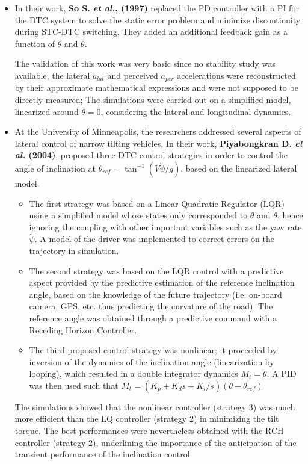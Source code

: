 \begin{itemize}
\begin{itemize}
\item In their work, \textbf{So S. \textit{et al.}, (1997)}\cite{doi:10.1504/IJVD.1997.062071} replaced the PD controller with a PI for the DTC system to solve the static error problem and minimize discontinuity during STC-DTC switching. They added an additional feedback gain as a function of $\theta$ and $\dot{\theta}$. 

The validation of this work was very basic since no stability study was available, the lateral $a_{lat}$ and perceived $a_{per}$ accelerations were reconstructed by their approximate mathematical expressions and were not supposed to be directly measured; The simulations were carried out on a simplified model, linearized around $\theta=0$, considering the lateral and longitudinal dynamics.
\newpage
\item At the University of Minneapolis, the researchers addressed several aspects of lateral control of narrow tilting vehicles. In their work, \textbf{Piyabongkran D. \textit{et al.} (2004)}\cite{piyabongkarn2004active}, proposed three DTC control strategies in order to control the angle of inclination at $\theta_{ref}=\tan^{-1}(V\dot{\psi}/g)$, based on the linearized lateral model. 

\begin{itemize}
\item The first strategy was based on a Linear Quadratic Regulator (LQR) using a simplified model whose states only corresponded to $\theta$ and $\dot{\theta}$, hence ignoring the coupling with other important variables such as the yaw rate $\dot{\psi}$. A model of the driver was implemented to correct errors on the trajectory in simulation. 
\item The second strategy was based on the LQR control with a predictive aspect provided by the predictive estimation of the reference inclination angle, based on the knowledge of the future trajectory (i.e. on-board camera, GPS, etc. thus predicting the curvature of the road). The reference angle was obtained through a predictive command with a Receding Horizon Controller. 
\item The third proposed control strategy was nonlinear; it proceeded by inversion of the dynamics of the inclination angle (linearization by looping), which resulted in a double integrator dynamics $M_{t}=\ddot{\theta}$. A PID was then used such that $M_{t}=(K_{p}+K_{d}s+K_{i}/s)(\theta-\theta_{ref})$ 
\end{itemize}

The simulations showed that the nonlinear controller (strategy 3) was much more efficient than the LQ controller (strategy 2) in minimizing the tilt torque. The best performances were nevertheless obtained with the RCH controller (strategy 2), underlining the importance of the anticipation of the transient performance of the inclination control.


\end{itemize}
\end{itemize}
